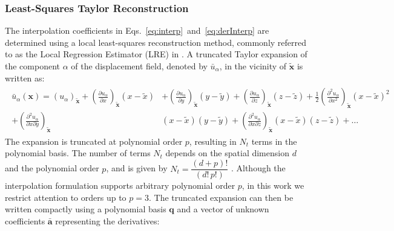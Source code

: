 \documentclass[review,3p]{elsarticle}
\newcommand{\bb}{\boldsymbol}
\begin{document}
\subsubsection{Least-Squares Taylor Reconstruction}
%
The interpolation coefficients in Eqs.~\eqref{eq:interp}~and~\eqref{eq:derInterp} are determined using a local least-squares reconstruction method, commonly referred to as the Local Regression Estimator (LRE) in \cite{Castrillo2022, Castrillo2024, Castrillo2023}. A truncated Taylor expansion of the component $\alpha$ of the displacement field, denoted by $\bar{u}_\alpha$, in the vicinity of $\tilde{\boldsymbol{x}}$ is written as:
%
\begin{eqnarray}
	\begin{split}
		\bar{u}_\alpha(\bb{x}) =
		(u_\alpha)_{\tilde{\bb{x}}}
		+ \left(\frac{\partial u_\alpha}{\partial x}\right)_{\tilde{\bb{x}}}(x-\tilde{x})&
		+ \left(\frac{\partial u_\alpha}{\partial y}\right)_{\tilde{\bb{x}}}(y-\tilde{y})
		+ \left(\frac{\partial u_\alpha}{\partial z}\right)_{\tilde{\bb{x}}}(z-\tilde{z})
		+ \frac{1}{2}\left(\frac{\partial^2 u_\alpha}{\partial x^2}\right)_{\tilde{\bb{x}}}(x-\tilde{x})^2 \\
		+  \left(\frac{\partial^2 u_\alpha}{\partial x \partial y}\right)_{\tilde{\bb{x}}}&(x-\tilde{x})(y-\tilde{y})
		+  \left(\frac{\partial^2 u_\alpha}{\partial x \partial z}\right)_{\tilde{\bb{x}}}(x-\tilde{x})(z-\tilde{z})
		+ \dots
	\end{split}
	\label{eq:te}
\end{eqnarray}
%
The expansion is truncated at polynomial order $p$, resulting in $N_t$ terms in the polynomial basis.
The number of terms $N_t$ depends on the spatial dimension $d$ and the polynomial order $p$, and is given by
$N_t = \dfrac{(d+p)!}{(d!\,p!)}$ \cite{Khelladi2011}.
Although the interpolation formulation supports arbitrary polynomial order $p$, in this work we restrict attention to orders up to $p = 3$.
The truncated expansion can then be written compactly using a polynomial basis $\mathbf{q}$ and a vector of unknown coefficients $\bar{\mathbf{a}}$ representing the derivatives:
\end{document}
